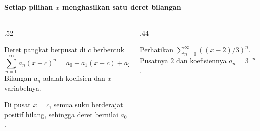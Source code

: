 \documentclass{../../kalkulus-ppt}
\begin{document}
\begin{frame}{\insertsection}
    \framesubtitle{Setiap pilihan $x$ menghasilkan satu deret bilangan}
    \begin{columns}[c,onlytextwidth]
        \begin{column}{.52\textwidth}
            \begin{definisi}
                Deret pangkat berpusat di $c$ berbentuk
                \[
                    \sum_{n=0}^\infty a_n(x-c)^n
                    =a_0+a_1(x-c)+a_2(x-c)^2+\cdots.
                \]
                Bilangan $a_n$ adalah koefisien dan $x$ variabelnya.
            \end{definisi}
            Di pusat $x=c$, semua suku berderajat positif
            hilang, sehingga deret bernilai $a_0$.
        \end{column}
        \begin{column}{.44\textwidth}
            \begin{contoh}
                Perhatikan $\sum_{n=0}^\infty ((x-2)/3)^n$.
                Pusatnya $2$ dan koefisiennya $a_n=3^{-n}$.
            \end{contoh}
        \end{column}
    \end{columns}
\end{frame}
\end{document}
